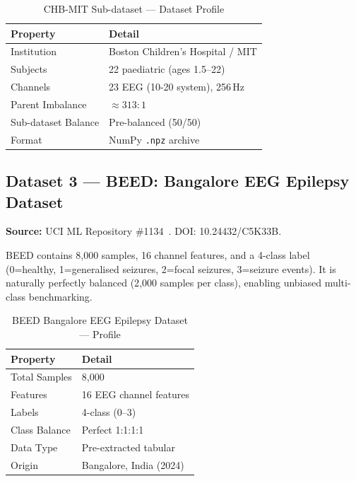 \documentclass[conference]{IEEEtran}
\begin{document}
\begin{table}[H]
  \centering
  \caption{CHB-MIT Sub-dataset --- Dataset Profile}
  \label{tab:chbmit}
  \begin{tabular}{ll}
    \toprule
    \textbf{Property}        & \textbf{Detail} \\
    \midrule
    Institution              & Boston Children's Hospital / MIT \\
    Subjects                 & 22 paediatric (ages 1.5--22) \\
    Channels                 & 23 EEG (10-20 system), 256\,Hz \\
    Parent Imbalance         & ${\approx}313{:}1$ \\
    Sub-dataset Balance      & Pre-balanced (50/50) \\
    Format                   & NumPy \texttt{.npz} archive \\
    \bottomrule
  \end{tabular}
\end{table}

\subsection{Dataset 3 --- BEED: Bangalore EEG Epilepsy Dataset}

\textbf{Source:} UCI ML Repository \#1134~\cite{beed2024}.
DOI: 10.24432/C5K33B.

BEED contains 8{,}000 samples, 16 channel features, and a 4-class label
(0=healthy, 1=generalised seizures, 2=focal seizures, 3=seizure events).
It is naturally perfectly balanced (2{,}000 samples per class), enabling
unbiased multi-class benchmarking.

\begin{table}[H]
  \centering
  \caption{BEED Bangalore EEG Epilepsy Dataset --- Profile}
  \label{tab:beed}
  \begin{tabular}{ll}
    \toprule
    \textbf{Property} & \textbf{Detail} \\
    \midrule
    Total Samples     & 8{,}000 \\
    Features          & 16 EEG channel features \\
    Labels            & 4-class (0--3) \\
    Class Balance     & Perfect 1:1:1:1 \\
    Data Type         & Pre-extracted tabular \\
    Origin            & Bangalore, India (2024) \\
    \bottomrule
  \end{tabular}
\end{table}
\end{document}
